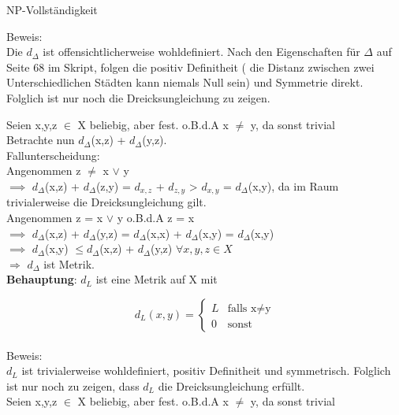 \documentclass[answers]{submit}
\begin{document}
\begin{exercise}[7]{NP-Vollständigkeit}
{  Beweis: \\

  Die $d_{\Delta}$ ist offensichtlicherweise wohldefiniert. Nach den Eigenschaften  für $\Delta$ auf Seite 68 im Skript, folgen die positiv Definitheit ( die Distanz zwischen zwei Unterschiedlichen Städten kann niemals Null sein) und Symmetrie direkt. Folglich ist nur noch die Dreicksungleichung zu zeigen.

  Seien x,y,z $\in$ X beliebig, aber fest. o.B.d.A x $\neq$ y, da sonst trivial \\

  Betrachte nun $d_{\Delta}$(x,z) + $d_{\Delta}$(y,z). \\

  Fallunterscheidung: \\

  Angenommen z $\neq$ x $\lor$ y \\

  $\implies$ $d_{\Delta}$(x,z) + $d_{\Delta}$(z,y) = $d_{x,z}$ + $d_{z,y}$ > $d_{x,y}$ = $d_{\Delta}$(x,y), da im Raum trivialerweise die Dreicksungleichung gilt. \\

  Angenommen z = x $\lor$ y  o.B.d.A z = x\\

  $\implies$ $d_{\Delta}$(x,z) + $d_{\Delta}$(y,z) = $d_{\Delta}$(x,x) + $d_{\Delta}$(x,y) = $d_{\Delta}$(x,y) \\

  $\implies$ $d_{\Delta}$(x,y) $ \leq d_{\Delta}$(x,z) + $d_{\Delta}$(y,z) $\forall x,y,z \in X$  \\

  $\Rightarrow$ $d_{\Delta}$ ist Metrik. \\

  \textbf{Behauptung}: $d_L$ ist eine Metrik auf X mit

  $$d_L(x,y)=\begin{cases}
      L & \text{falls x} \neq \text{y} \\
      0 & \text{sonst}
    \end{cases}$$ \\

  Beweis: \\

  $d_L$ ist trivialerweise wohldefiniert, positiv Definitheit und symmetrisch. Folglich ist nur noch zu zeigen, dass $d_L$ die Dreicksungleichung erfüllt. \\

  Seien x,y,z $\in$ X beliebig, aber fest. o.B.d.A x $\neq$ y, da sonst trivial \\

}
\end{exercise}
\end{document}
